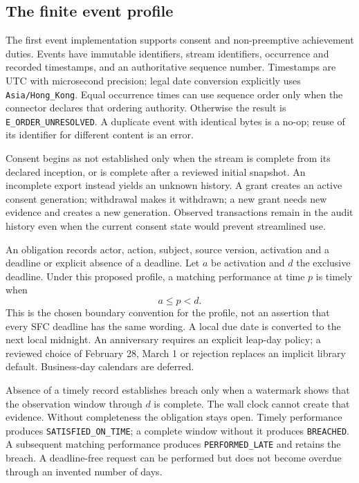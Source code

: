 \documentclass[12pt,a4paper,oneside,openany]{book}
\begin{document}
\subsection{The finite event profile}
\label{merge:P-03b-event-contract:00}


The first event implementation supports consent and non-preemptive achievement
duties. Events have immutable identifiers, stream identifiers, occurrence and
recorded timestamps, and an authoritative sequence number. Timestamps are UTC
with microsecond precision; legal date conversion explicitly uses
\texttt{Asia/Hong\_Kong}. Equal occurrence times can use sequence order only
when the connector declares that ordering authority. Otherwise the result is
\texttt{E\_ORDER\_UNRESOLVED}. A duplicate event with identical bytes is a
no-op; reuse of its identifier for different content is an error.

Consent begins as not established only when the stream is complete from its
declared inception, or is complete after a reviewed initial snapshot. An incomplete export
instead yields an unknown history. A grant creates an active consent generation;
withdrawal makes it withdrawn; a new grant needs new evidence and creates a new
generation. Observed transactions remain in the audit history even when the
current consent state would prevent streamlined use.

An obligation records actor, action, subject, source version, activation and a
deadline or explicit absence of a deadline. Let $a$ be activation and $d$ the
exclusive deadline. Under this proposed profile, a matching performance at time
$p$ is timely when
\begin{equation}
 a\leq p<d.
 \label{eq:timely}
\end{equation}
This is the chosen boundary convention for the profile, not an assertion that
every SFC deadline has the same wording. A local due date is converted to the
next local midnight. An anniversary requires an explicit leap-day policy; a
reviewed choice of February 28, March 1 or rejection replaces an implicit library
default. Business-day calendars are deferred.

Absence of a timely record establishes breach only when a watermark shows that
the observation window through $d$ is complete. The wall clock cannot create
that evidence. Without completeness the obligation stays open. Timely performance
produces \texttt{SATISFIED\_ON\_TIME}; a complete window without it produces
\texttt{BREACHED}. A subsequent matching performance produces
\texttt{PERFORMED\_LATE} and retains the breach. A deadline-free request can be
performed but does not become overdue through an invented number of days.
\end{document}
